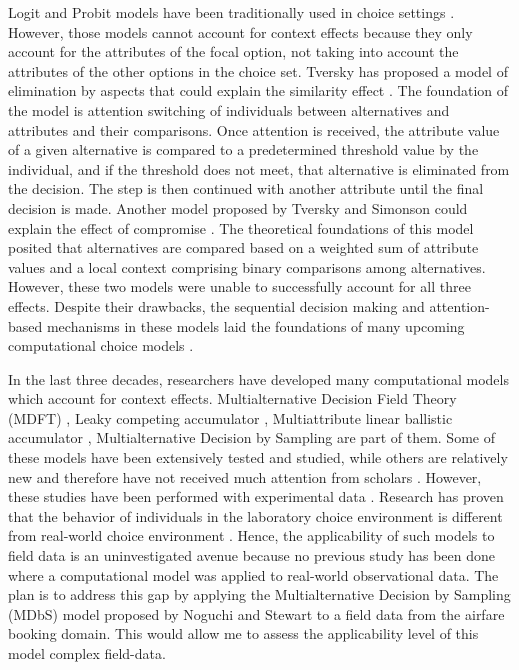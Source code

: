 \documentclass[a4paper,12pt]{article}
\newcommand{\citeyearonly}[1]{\citeyearpar{#1}}
\begin{document}
Logit and Probit models have been traditionally used in choice settings \citep{gensch1979multinomial, kim2017probit}. However, those models cannot account for context effects because they only account for the attributes of the focal option, not taking into account the attributes of the other options in the choice set. Tversky has proposed a model of elimination by aspects that could explain the similarity effect \citeyearonly{tversky1972elimination}. The foundation of the model is attention switching of individuals between alternatives and attributes and their comparisons. Once attention is received, the attribute value of a given alternative is compared to a predetermined threshold value by the individual, and if the threshold does not meet, that alternative is eliminated from the decision. The step is then continued with another attribute until the final decision is made. Another model proposed by Tversky and Simonson could explain the effect of compromise \citeyearonly{tverskySimonson93}. The theoretical foundations of this model posited that alternatives are compared based on a weighted sum of attribute values and a local context comprising binary comparisons among alternatives. However, these two models were unable to successfully account for all three effects. Despite their drawbacks, the sequential decision making and attention-based mechanisms in these models laid the foundations of many upcoming computational choice models \citep{bhatia2013associations}. 

In the last three decades, researchers have developed many computational models which account for context effects. Multialternative Decision Field Theory (MDFT) \citep{roe2001multialternative}, Leaky competing
accumulator \citep{usher2001time}, Multiattribute linear ballistic accumulator \citep{trueblood2014multiattribute}, Multialternative Decision by Sampling  \citep{noguchi2018multialternative} are part of them. Some of these models have been extensively tested and studied, while others are relatively new and therefore have not received much attention from scholars \citep{truebloodEtAl13}. However, these studies have been performed with experimental data \citep{trueblood2014multiattribute,  berkowitsch2014rigorously, evans2019response, busemeyer2019cognitive}. Research has proven that the behavior of individuals in the laboratory choice environment is different from real-world choice environment \citep{hogarth1989risk}. Hence, the applicability of such models to field data is an uninvestigated avenue because no previous study has been done where a computational model was applied to real-world observational data. The plan is to address this gap by applying the Multialternative Decision by Sampling (MDbS) model proposed by Noguchi and Stewart \citeyearonly{noguchi2018multialternative} to a field data from the airfare booking domain. This would allow me to assess the applicability level of this model complex field-data. 
\end{document}

